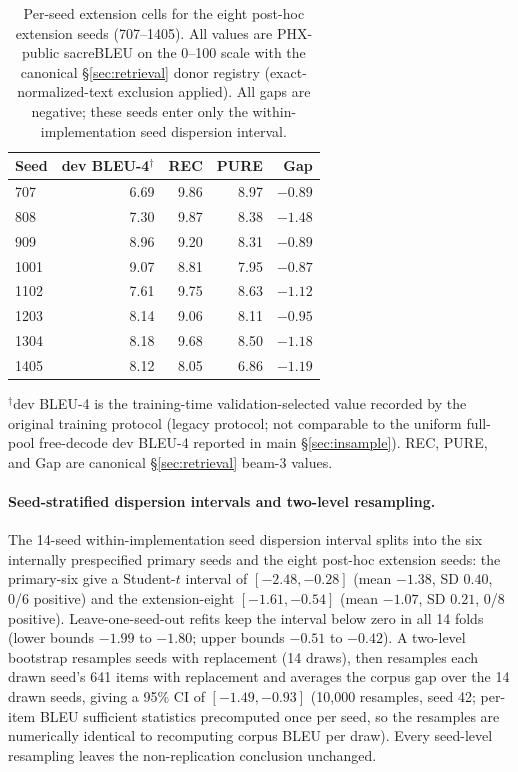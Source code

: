 \documentclass[pdflatex,sn-chicago]{sn-jnl}
\begin{document}
\begin{table}[h]
\centering
\scriptsize
\caption{Per-seed extension cells for the eight post-hoc extension seeds (707--1405). All values are PHX-public sacreBLEU on the 0--100 scale with the canonical \S\ref{sec:retrieval} donor registry (exact-normalized-text exclusion applied). All gaps are negative; these seeds enter only the within-implementation seed dispersion interval.}
\label{tab:extension_cells}
\begin{tabular}{lrrrr}
\toprule
Seed & dev BLEU-4$^{\dagger}$ & REC & PURE & Gap \\
\midrule
707  & 6.69 & 9.86 & 8.97 & $-0.89$ \\
808  & 7.30 & 9.87 & 8.38 & $-1.48$ \\
909  & 8.96 & 9.20 & 8.31 & $-0.89$ \\
1001 & 9.07 & 8.81 & 7.95 & $-0.87$ \\
1102 & 7.61 & 9.75 & 8.63 & $-1.12$ \\
1203 & 8.14 & 9.06 & 8.11 & $-0.95$ \\
1304 & 8.18 & 9.68 & 8.50 & $-1.18$ \\
1405 & 8.12 & 8.05 & 6.86 & $-1.19$ \\
\bottomrule
\end{tabular}
\par\smallskip
\footnotesize $^\dagger$dev BLEU-4 is the training-time validation-selected value recorded by the original training protocol (legacy protocol; not comparable to the uniform full-pool free-decode dev BLEU-4 reported in main \S\ref{sec:insample}). REC, PURE, and Gap are canonical \S\ref{sec:retrieval} beam-3 values.
\end{table}

\paragraph{Seed-stratified dispersion intervals and two-level resampling.}
The 14-seed within-implementation seed dispersion interval splits into the six internally prespecified primary seeds and the eight post-hoc extension seeds: the primary-six give a Student-$t$ interval of $[-2.48,-0.28]$ (mean $-1.38$, SD $0.40$, 0/6 positive) and the extension-eight $[-1.61,-0.54]$ (mean $-1.07$, SD $0.21$, 0/8 positive). Leave-one-seed-out refits keep the interval below zero in all 14 folds (lower bounds $-1.99$ to $-1.80$; upper bounds $-0.51$ to $-0.42$). A two-level bootstrap resamples seeds with replacement (14 draws), then resamples each drawn seed's 641 items with replacement and averages the corpus gap over the 14 drawn seeds, giving a 95\% CI of $[-1.49,-0.93]$ (10{,}000 resamples, seed 42; per-item BLEU sufficient statistics precomputed once per seed, so the resamples are numerically identical to recomputing corpus BLEU per draw). Every seed-level resampling leaves the non-replication conclusion unchanged.
\end{document}
